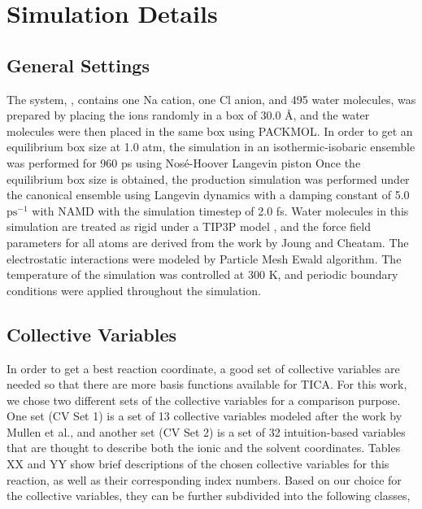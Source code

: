\section{Simulation Details}
\begin{spacing}{2.0}
    \subsection{General Settings}

    The system, , contains one Na cation, one Cl anion, and 495 water molecules, was prepared by placing the ions randomly in a 
    box of 30.0 \r{A}, and the water molecules were then placed in the same box using PACKMOL. \cite{P-JCompChem-2009-v30-Martinez} In order to 
    get an equilibrium box size at 1.0 atm, the simulation in an isothermic-isobaric ensemble was performed for 960 ps using Nos\'{e}-Hoover 
    Langevin piston \cite{P-JChemPhys-1994-v101-Martyna, P-JChemPhys-1995-v103-Feller} Once the equilibrium box size is obtained, the production 
    simulation was performed under the canonical ensemble using Langevin dynamics with a damping constant of 5.0 $\mathrm{ps}^{-1}$ with NAMD 
    \cite{P-JCompChem-2005-v26-Phillips} with the simulation timestep of 2.0 fs. Water molecules in this simulation are treated as rigid under a 
    TIP3P model \cite{P-JChemPhys-1983-v79-Jorgensen}, and the force field parameters for all atoms are derived from the work by Joung and Cheatam. 
    \cite{P-JPhysChemB-2008-v112-Joung} The electrostatic interactions were modeled by Particle Mesh Ewald \cite{P-JChemPhys-1993-v98-Darden} 
    algorithm. The temperature of the simulation was controlled at 300 K, and periodic boundary conditions were applied throughout the simulation.

    \subsection{Collective Variables}

    In order to get a best reaction coordinate, a good set of collective variables are needed so that there are more basis functions available for
    TICA. For this work, we chose two different sets of the collective variables for a comparison purpose. One set (CV Set 1) is a set of 13 
    collective variables modeled after the work by Mullen et al., and another set (CV Set 2) is a set of 32 intuition-based variables that are 
    thought to describe both the ionic and the solvent coordinates. Tables XX and YY show brief descriptions of the chosen collective variables for 
    this reaction, as well as their corresponding index numbers. Based on our choice for the collective variables, they can be further subdivided 
    into the following classes,


\end{spacing}
